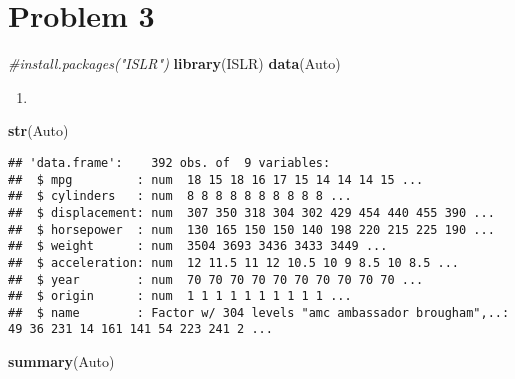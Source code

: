 \documentclass[]{article}
\newenvironment{Shaded}{\begin{snugshade}}{\end{snugshade}}
\newcommand{\CommentTok}[1]{\textcolor[rgb]{0.56,0.35,0.01}{\textit{#1}}}
\newcommand{\KeywordTok}[1]{\textcolor[rgb]{0.13,0.29,0.53}{\textbf{#1}}}
\newcommand{\NormalTok}[1]{#1}
\begin{document}
\hypertarget{problem-3}{%
\section{Problem 3}\label{problem-3}}

\begin{Shaded}
\begin{Highlighting}[]
\CommentTok{#install.packages("ISLR")}
\KeywordTok{library}\NormalTok{(ISLR)}
\KeywordTok{data}\NormalTok{(Auto)}
\end{Highlighting}
\end{Shaded}

\begin{enumerate}
\def\labelenumi{\alph{enumi})}
\item
\end{enumerate}

\begin{Shaded}
\begin{Highlighting}[]
\KeywordTok{str}\NormalTok{(Auto)}
\end{Highlighting}
\end{Shaded}

\begin{verbatim}
## 'data.frame':    392 obs. of  9 variables:
##  $ mpg         : num  18 15 18 16 17 15 14 14 14 15 ...
##  $ cylinders   : num  8 8 8 8 8 8 8 8 8 8 ...
##  $ displacement: num  307 350 318 304 302 429 454 440 455 390 ...
##  $ horsepower  : num  130 165 150 150 140 198 220 215 225 190 ...
##  $ weight      : num  3504 3693 3436 3433 3449 ...
##  $ acceleration: num  12 11.5 11 12 10.5 10 9 8.5 10 8.5 ...
##  $ year        : num  70 70 70 70 70 70 70 70 70 70 ...
##  $ origin      : num  1 1 1 1 1 1 1 1 1 1 ...
##  $ name        : Factor w/ 304 levels "amc ambassador brougham",..: 49 36 231 14 161 141 54 223 241 2 ...
\end{verbatim}

\begin{Shaded}
\begin{Highlighting}[]
\KeywordTok{summary}\NormalTok{(Auto)}
\end{Highlighting}
\end{Shaded}
\end{document}
